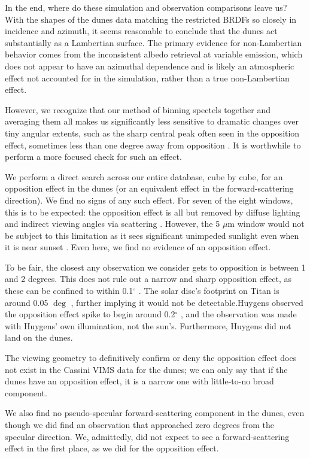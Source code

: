 \documentclass[twocolumn,linenumbers]{aastex631}
\begin{document}
In the end, where do these simulation and observation comparisons leave us? With the shapes of the dunes data matching the restricted BRDFs so closely in incidence and azimuth, it seems reasonable to conclude that the dunes act substantially as a Lambertian surface. The primary evidence for non-Lambertian behavior comes from the inconsistent albedo retrieval at variable emission, which does not appear to have an azimuthal dependence and is likely an atmospheric effect not accounted for in the simulation, rather than a true non-Lambertian effect.

However, we recognize that our method of binning spectels together and averaging them all makes us significantly less sensitive to dramatic changes over tiny angular extents, such as the sharp central peak often seen in the opposition effect, sometimes less than one degree away from opposition \citep{Kulyk2008, Schaefer2008}. It is worthwhile to perform a more focused check for such an effect.

We perform a direct search across our entire database, cube by cube, for an opposition effect in the dunes (or an equivalent effect in the forward-scattering direction). We find no signs of any such effect. For seven of the eight windows, this is to be expected: the opposition effect is all but removed by diffuse lighting and indirect viewing angles via scattering \citep{Schroder2008}. However, the 5 $\mu$m window would not be subject to this limitation as it sees significant unimpeded sunlight even when it is near sunset \citep{Barnes2018b}. Even here, we find no evidence of an opposition effect.

To be fair, the closest any observation we consider gets to opposition is between 1 and 2 degrees. This does not rule out a narrow and sharp opposition effect, as these can be confined to within 0.1$^{\circ}$ \citep{Kulyk2008, Schaefer2008}. The solar disc's footprint on Titan is around 0.05 $\deg$ \citep{Barnes2011}, further implying it would not be detectable.Huygens observed the opposition effect spike to begin around 0.2$^{\circ}$ \citep{Karkoschka2012}, and the observation was made with Huygens' own illumination, not the sun's. Furthermore, Huygens did not land on the dunes. 

The viewing geometry to definitively confirm or deny the opposition effect does not exist in the Cassini VIMS data for the dunes; we can only say that if the dunes have an opposition effect, it is a narrow one with little-to-no broad component.

We also find no pseudo-specular forward-scattering component in the dunes, even though we did find an observation that approached zero degrees from the specular direction. We, admittedly, did not expect to see a forward-scattering effect in the first place, as we did for the opposition effect.
\end{document}
